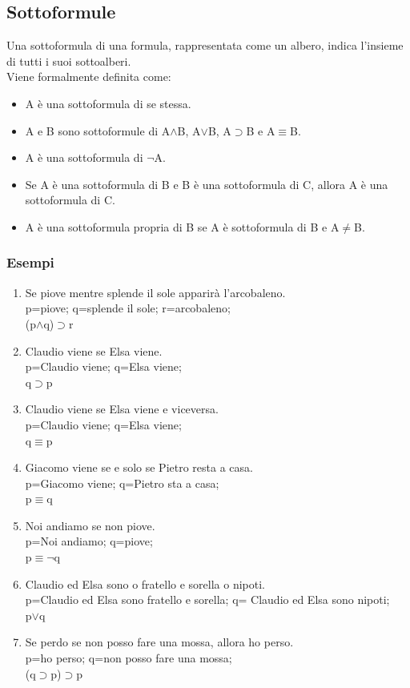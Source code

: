 \documentclass[../main.tex]{subfiles}
\begin{document}
    \subsection{Sottoformule}
    Una sottoformula di una formula, rappresentata come un albero, indica l'insieme di tutti i suoi sottoalberi.\\
    Viene formalmente definita come:
    \begin{itemize}
        \item A è una sottoformula di se stessa.
        \item A e B sono sottoformule di A$\land$B, A$\lor$B, A$\supset$B e A$\equiv$B.
        \item A è una sottoformula di $\lnot$A.
        \item Se A è una sottoformula di B e B è una sottoformula di C, allora A è una sottoformula di C.
        \item A è una sottoformula propria di B se A è sottoformula di B e A$\neq$B.
    \end{itemize}

    \subsubsection{Esempi}
    \begin{enumerate}
        \item Se piove mentre splende il sole apparirà l'arcobaleno.\\
            p=piove; q=splende il sole; r=arcobaleno;\\
            (p$\land$q)$\supset$r
        \item Claudio viene se Elsa viene.\\
            p=Claudio viene; q=Elsa viene;\\
            q$\supset$p
        \item Claudio viene se Elsa viene e viceversa.\\
            p=Claudio viene; q=Elsa viene;\\
            q$\equiv$p
        \item Giacomo viene se e solo se Pietro resta a casa.\\
            p=Giacomo viene; q=Pietro sta a casa;\\
            p$\equiv$q
        \item Noi andiamo se non piove.\\
            p=Noi andiamo; q=piove;\\
            p$\equiv \lnot$q
        \item Claudio ed Elsa sono o fratello e sorella o nipoti.\\
            p=Claudio ed Elsa sono fratello e sorella; q= Claudio ed Elsa sono nipoti;\\
            p$\lor$q
        \item Se perdo se non posso fare una mossa, allora ho perso.\\
            p=ho perso; q=non posso fare una mossa;\\
            (q$\supset$p)$\supset$p
    \end{enumerate}
\end{document}
